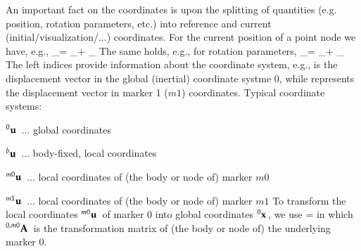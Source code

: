 \documentclass[11pt,a4paper]{book} %
\newcommand{\cRef}{_\mathrm{ref}} %
\newcommand{\cCur}{_\mathrm{cur}} %
\begin{document}
%
An important fact on the coordinates is upon the splitting of quantities (e.g. position, rotation parameters, etc.) into reference and current (initial/visualization/...) coordinates.
For the current position of a point node we have, e.g.,
\be
  \pv\cCur = \pv\cRef + \uv\cCur
\ee
The same holds, e.g., for rotation parameters,
\be
  \ttheta\cCur = \ttheta\cRef + \tpsi\cCur
\ee
%
\noindent The left indices provide information about the coordinate system, e.g.,
\be
\ee
is the displacement vector in the global (inertial) coordinate systme $0$, while 
\be
\ee
represents the displacement vector in marker 1 ($m1$) coordinates. Typical coordinate systems:
\bi
  \item $\prescript{0}{}{\mathbf{u}}\,$ $\ldots$ global coordinates
  \item $\prescript{b}{}{\mathbf{u}}\,$ $\ldots$ body-fixed, local coordinates
  \item $\prescript{m0}{}{\mathbf{u}}\,$ $\ldots$ local coordinates of (the body or node of) marker $m0$
  \item $\prescript{m1}{}{\mathbf{u}}\,$ $\ldots$ local coordinates of (the body or node of) marker $m1$
\ei
To transform the local coordinates $\prescript{m0}{}{\mathbf{u}}\,$ of marker 0 into global coordinates $\prescript{0}{}{\mathbf{x}}\,$, we use
\be
   =  
\ee
in which $\prescript{0,m0}{}{\mathbf{A}}\,$ is the transformation matrix of (the body or node of) the underlying marker 0.



\newpage
\end{document}
